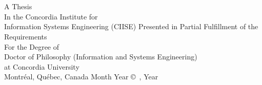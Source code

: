 
\thispagestyle{empty} %

\begin{center} 
\begin{Large} \subject \end{Large}\\[3em]
\begin{large} \student \end{large}\\
\vfill
A Thesis\\
In the Concordia Institute for 
\\ Information Systems Engineering (CIISE)
\vfill
Presented in Partial Fulfillment of the Requirements\\
For the Degree of\\
Doctor of Philosophy (Information and Systems Engineering)\\
at Concordia University\\
Montr\'{e}al, Qu\'{e}bec, Canada
\vfill
Month Year
\vfill
\copyright~\student, Year\\

\end{center}



